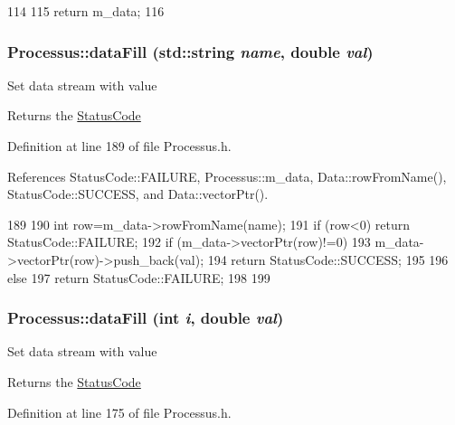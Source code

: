 \begin{DoxyCode}
114               {
115     return m_data;
116   }
\end{DoxyCode}
\hypertarget{classProcessus_aa31ab71711f7af6a729441ff573f69c9}{
\subsubsection[{dataFill}]{ Processus::dataFill (std::string {\em name}, \/  double {\em val})}}
\label{classProcessus_aa31ab71711f7af6a729441ff573f69c9}
Set data stream with value \begin{DoxyReturn}{Returns}
the \hyperlink{classStatusCode}{StatusCode} 
\end{DoxyReturn}


Definition at line 189 of file Processus.h.

References StatusCode::FAILURE, Processus::m\_\-data, Data::rowFromName(), StatusCode::SUCCESS, and Data::vectorPtr().


\begin{DoxyCode}
189                                                  {
190     int row=m_data->rowFromName(name);
191     if (row<0) return StatusCode::FAILURE;
192     if (m_data->vectorPtr(row)!=0){
193       m_data->vectorPtr(row)->push_back(val);
194       return StatusCode::SUCCESS;
195     }
196     else {
197       return StatusCode::FAILURE;
198     }
199   }
\end{DoxyCode}
\hypertarget{classProcessus_a0d093b48f3218a088ba030e24372f18c}{
\subsubsection[{dataFill}]{ Processus::dataFill (int {\em i}, \/  double {\em val})}}
\label{classProcessus_a0d093b48f3218a088ba030e24372f18c}
Set data stream with value \begin{DoxyReturn}{Returns}
the \hyperlink{classStatusCode}{StatusCode} 
\end{DoxyReturn}


Definition at line 175 of file Processus.h.

